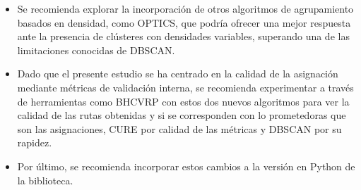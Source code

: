 \begin{itemize}
  \item Se recomienda explorar la incorporaci\'on de otros algoritmos de agrupamiento basados en densidad, como OPTICS, que podr\'ia ofrecer una mejor respuesta ante la presencia de cl\'usteres con densidades variables, superando una de las limitaciones conocidas de DBSCAN.
  \item Dado que el presente estudio se ha centrado en la calidad de la asignaci\'on mediante m\'etricas de validaci\'on interna, se recomienda experimentar a trav\'es de herramientas como BHCVRP con estos dos nuevos algoritmos para ver la calidad de las rutas obtenidas y si se corresponden con lo prometedoras que son las asignaciones, CURE por calidad de las m\'etricas y DBSCAN por su rapidez.
  \item Por \'ultimo, se recomienda incorporar estos cambios a la versi\'on en Python de la biblioteca.
\end{itemize}

